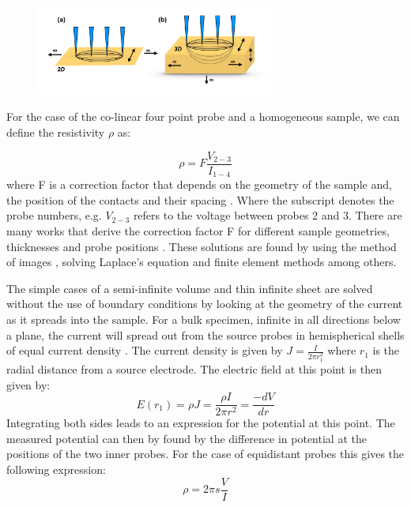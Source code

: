     \begin{figure}[h]
        \centering
        \includegraphics[width=0.7\textwidth]{fig/4pp/4pp_current.png}
        \caption{\cite{Miccoli2015TheSystems}}
        \label{fig:4ppcurret}
    \end{figure}
    For the case of the co-linear four point probe and a homogeneous sample, we can define the resistivity $\rho$ as:
    
    \begin{equation}
    \rho = F\frac{V_{2-3}}{I_{1-4}}
    \end{equation}
    where F is a correction factor that depends on the geometry of the sample and, the position of the contacts and their spacing \cite{Miccoli2015TheSystems}. Where the subscript denotes the probe numbers, e.g. $V_{2-3}$ refers to the voltage between probes 2 and 3. There are many works that derive the correction factor F for different sample geometries, thicknesses and probe positions \cite{Smits} \cite{ValdestResistivityTransistors} \cite{Topsoe1991GeometricCorrection} \cite{}. These solutions are found by using the method of images \cite{ValdestResistivityTransistors}, solving Laplace's equation \cite{Esposito2000DeterminationCrystals} and finite element methods \cite{Zimney2007CorrectionStudy} among others. 
    
    The simple cases of a semi-infinite volume and thin infinite sheet are solved without the use of boundary conditions by looking at the geometry of the current as it spreads into the sample. For a bulk specimen, infinite in all directions below a plane, the current will spread out from the source probes in hemispherical shells of equal current density \cite{Miccoli2015TheSystems}.
    The current density is given by $J=\frac{I}{2 \pi r^2_1}$ where $r_1$ is the radial distance from a source electrode. The electric field at this point is then given by:
    \begin{equation}
    E(r_1) = \rho J = \frac{\rho I}{2 \pi r^2}=\frac{-dV}{dr}
    \end{equation}
    Integrating both sides leads to an expression for the potential at this point. The measured potential can then by found by the difference in potential at the positions of the two inner probes. For the case of equidistant probes this gives the following expression:
    \begin{equation}
        \rho = 2 \pi s\frac{V}{I}
    \end{equation}
    
